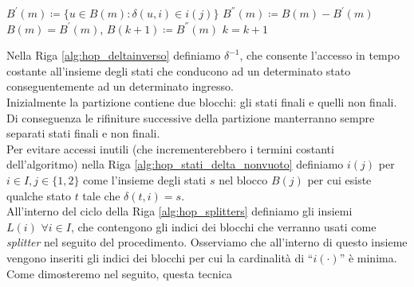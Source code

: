 {\begin{algorithm}[H]
{{{                    $B^{'}(m) \coloneqq \{u \in B(m) : \delta(u,i) \in i(j)\}$\;\label{alg:hop_split}
                    $B^{''}(m) \coloneqq B(m) - B^{'}(m)$\;
                    $B(m) = B^{'}(m)$, $B(k+1) \coloneqq B^{''}(m)$\;
                    $k = k + 1$\;
                }
            }
        }
        \thispagestyle{empty}
    \end{algorithm}
    \clearpage
}
Nella Riga \ref{alg:hop_deltainverso} definiamo $\delta^{-1}$, che consente l'accesso in tempo costante all'insieme degli stati che conducono ad un determinato stato conseguentemente ad un determinato ingresso.\\
Inizialmente la partizione contiene due blocchi: gli stati finali e quelli non finali. Di conseguenza le rifiniture successive della partizione manterranno sempre separati stati finali e non finali.\\
Per evitare accessi inutili (che incrementerebbero i termini costanti dell'algoritmo) nella Riga \ref{alg:hop_stati_delta_nonvuoto} definiamo $i(j)$ per $i \in I, j \in \{1,2\}$ come l'insieme degli stati $s$ nel blocco $B(j)$ per cui esiste qualche stato $t$ tale che $\delta(t,i) = s$.\\
All'interno del ciclo della Riga \ref{alg:hop_splitters} definiamo gli insiemi $L(i)\,\, \forall i \in I$, che contengono gli indici dei blocchi che verranno usati come \emph{splitter} nel seguito del procedimento. Osserviamo che all'interno di questo insieme vengono inseriti gli indici dei blocchi per cui la cardinalità di ``$i(\cdot)$'' è minima. Come dimosteremo nel seguito, questa tecnica

